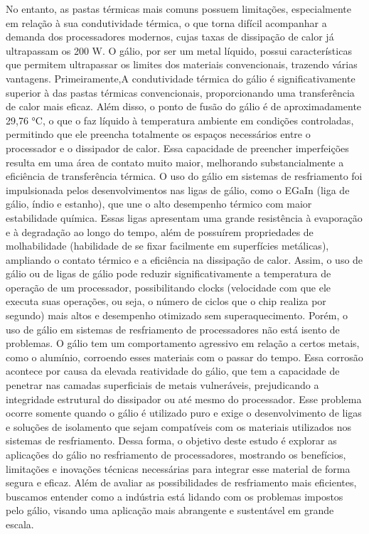 \documentclass{article}
\begin{document}
No entanto, as pastas térmicas mais comuns possuem limitações, especialmente em relação à sua condutividade térmica, o que torna difícil acompanhar a demanda dos processadores modernos, cujas taxas de dissipação de calor já ultrapassam os 200 W.
O gálio, por ser um metal líquido, possui características que permitem ultrapassar os limites dos materiais convencionais, trazendo várias vantagens. Primeiramente,A condutividade térmica do gálio é significativamente superior à das pastas térmicas convencionais, proporcionando uma transferência de calor mais eficaz. Além disso, o ponto de fusão do gálio é de aproximadamente 29,76 °C, o que o faz líquido à temperatura ambiente em condições controladas, permitindo que ele preencha totalmente os espaços necessários entre o processador e o dissipador de calor. Essa capacidade de preencher imperfeições resulta em uma área de contato muito maior, melhorando substancialmente a eficiência de transferência térmica.
O uso do gálio em sistemas de resfriamento foi impulsionada pelos desenvolvimentos nas ligas de gálio, como o EGaIn (liga de gálio, índio e estanho), que une o alto desempenho térmico com maior estabilidade química. Essas ligas apresentam uma grande resistência à evaporação e à degradação ao longo do tempo, além de possuírem propriedades de molhabilidade (habilidade de se fixar facilmente em superfícies metálicas), ampliando o contato térmico e a eficiência na dissipação de calor. Assim, o uso de gálio ou de ligas de gálio pode reduzir significativamente a temperatura de operação de um processador, possibilitando clocks (velocidade com que ele executa suas operações, ou seja, o número de ciclos que o chip realiza por segundo) mais altos e desempenho otimizado sem superaquecimento.
Porém, o uso de gálio em sistemas de resfriamento de processadores não está isento de problemas. O gálio tem um comportamento agressivo em relação a certos metais, como o alumínio, corroendo esses materiais com o passar do tempo. Essa corrosão acontece por causa da elevada reatividade do gálio, que tem a capacidade de penetrar nas camadas superficiais de metais vulneráveis, prejudicando a integridade estrutural do dissipador ou até mesmo do processador. Esse problema ocorre somente quando o gálio é utilizado puro e exige o desenvolvimento de ligas e soluções de isolamento que sejam compatíveis com os materiais utilizados nos sistemas de resfriamento.
Dessa forma, o objetivo deste estudo é explorar as aplicações do gálio no resfriamento de processadores, mostrando os benefícios, limitações e inovações técnicas necessárias para integrar esse material de forma segura e eficaz. Além de avaliar as possibilidades de resfriamento mais eficientes, buscamos entender como a indústria está lidando com os problemas impostos pelo gálio, visando uma aplicação mais abrangente e sustentável em grande escala.
\end{document}
